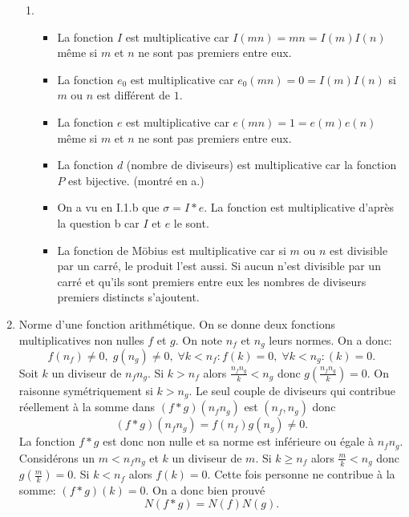\begin{enumerate}
\begin{enumerate}
 \item
\begin{itemize}
 \item La fonction $I$ est multiplicative car $I(mn)=mn=I(m)I(n)$ même si $m$ et $n$ ne sont pas premiers entre eux.
 \item La fonction $e_0$ est multiplicative car $e_0(mn)=0=I(m)I(n)$ si $m$ ou $n$ est différent de $1$.
 \item La fonction $e$ est multiplicative car $e(mn) = 1 = e(m)e(n)$ même si $m$ et $n$ ne sont pas premiers entre eux.
 \item La fonction $d$ (nombre de diviseurs) est multiplicative car la fonction $P$ est bijective. (montré en a.)
 \item On a vu en I.1.b que $\sigma = I*e$. La fonction est multiplicative d'après la question b car $I$ et $e$ le sont.
 \item La fonction de Möbius est multiplicative car si $m$ ou $n$ est divisible par un carré, le produit l'est aussi. Si aucun n'est divisible par un carré et qu'ils sont premiers entre eux les nombres de diviseurs premiers distincts s'ajoutent.
\end{itemize}
\end{enumerate}

\item Norme d'une fonction arithmétique. On se donne deux fonctions multiplicatives non nulles $f$ et $g$. On note $n_f$ et $n_g$ leurs normes. On a donc:
\begin{displaymath}
 f(n_f)\neq 0,\; g(n_g)\neq 0,\;\forall k < n_f : f(k) = 0 ,\;\forall k < n_g : (k) = 0 .
\end{displaymath}
Soit $k$ un diviseur de $n_fn_g$. Si $k>n_f$ alors $\frac{n_fn_g}{k}< n_g$ donc $g(\frac{n_fn_g}{k})=0$. On raisonne symétriquement si $k>n_g$. Le seul couple de diviseurs qui contribue réellement à la somme dans $(f*g)(n_fn_g)$ est $(n_f,n_g)$ donc
\begin{displaymath}
 (f*g)(n_fn_g) = f(n_f)g(n_g)\neq 0 .
\end{displaymath}
La fonction $f*g$ est donc non nulle et sa norme est inférieure ou égale à $n_fn_g$.\newline
Considérons un $m<n_fn_g$ et $k$ un diviseur de $m$.\newline
Si $k\geq n_f$ alors $\frac{m}{k}<n_g$ donc $g(\frac{m}{k})=0$. Si $k<n_f$ alors $f(k)=0$. Cette fois personne ne contribue à la somme: $(f*g)(k)=0$. On a donc bien prouvé
\begin{displaymath}
 N(f*g) = N(f)N(g).
\end{displaymath}
\end{enumerate}


